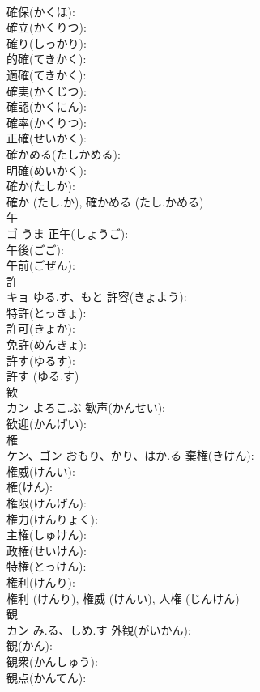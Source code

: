 \documentclass[8pt]{extreport}
\begin{document}
\begin{CJK}{UTF8}{min}
\\	確保(かくほ): 
\\	確立(かくりつ): 
\\	確り(しっかり): 
\\	的確(てきかく): 
\\	適確(てきかく): 
\\	確実(かくじつ): 
\\	確認(かくにん): 
\\	確率(かくりつ): 
\\	正確(せいかく): 
\\	確かめる(たしかめる): 
\\	明確(めいかく): 
\\	確か(たしか): 
\\	確か (たし.か), 確かめる (たし.かめる)
\\	午			
\\	ゴ	うま	正午(しょうご): 
\\	午後(ごご): 
\\	午前(ごぜん): 
\\	許			
\\	キョ	ゆる.す、もと	許容(きょよう): 
\\	特許(とっきょ): 
\\	許可(きょか): 
\\	免許(めんきょ): 
\\	許す(ゆるす): 
\\	許す (ゆる.す)
\\	歓			
\\	カン	よろこ.ぶ	歓声(かんせい): 
\\	歓迎(かんげい): 
\\	権			
\\	ケン、ゴン	おもり、かり、はか.る	棄権(きけん): 
\\	権威(けんい): 
\\	権(けん): 
\\	権限(けんげん): 
\\	権力(けんりょく): 
\\	主権(しゅけん): 
\\	政権(せいけん): 
\\	特権(とっけん): 
\\	権利(けんり): 
\\	権利 (けんり), 権威 (けんい), 人権 (じんけん)
\\	観			
\\	カン	み.る、しめ.す	外観(がいかん): 
\\	観(かん): 
\\	観衆(かんしゅう): 
\\	観点(かんてん): 

\end{CJK}
\end{document}
